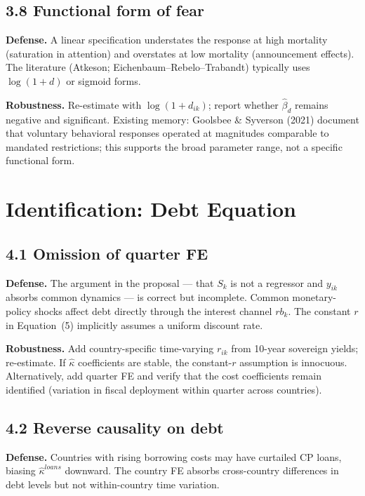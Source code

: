 \documentclass[11pt,a4paper]{article}
\begin{document}
\subsection*{3.8 Functional form of fear}

\textbf{Defense.} A linear specification understates the response at high mortality (saturation in attention) and overstates at low mortality (announcement effects). The literature (Atkeson; Eichenbaum--Rebelo--Trabandt) typically uses $\log(1+d)$ or sigmoid forms.

\textbf{Robustness.} Re-estimate with $\log(1+d_{ik})$; report whether $\hat\beta_d$ remains negative and significant. Existing memory: Goolsbee \& Syverson (2021) document that voluntary behavioral responses operated at magnitudes comparable to mandated restrictions; this supports the broad parameter range, not a specific functional form.

\section{Identification: Debt Equation}

\subsection*{4.1 Omission of quarter FE}

\textbf{Defense.} The argument in the proposal --- that $S_k$ is not a regressor and $y_{ik}$ absorbs common dynamics --- is correct but incomplete. Common monetary-policy shocks affect debt directly through the interest channel $r b_k$. The constant $r$ in Equation~(5) implicitly assumes a uniform discount rate.

\textbf{Robustness.} Add country-specific time-varying $r_{ik}$ from 10-year sovereign yields; re-estimate. If $\hat\kappa$ coefficients are stable, the constant-$r$ assumption is innocuous. Alternatively, add quarter FE and verify that the cost coefficients remain identified (variation in fiscal deployment within quarter across countries).

\subsection*{4.2 Reverse causality on debt}

\textbf{Defense.} Countries with rising borrowing costs may have curtailed CP loans, biasing $\hat\kappa^{loans}$ downward. The country FE absorbs cross-country differences in debt levels but not within-country time variation.
\end{document}
